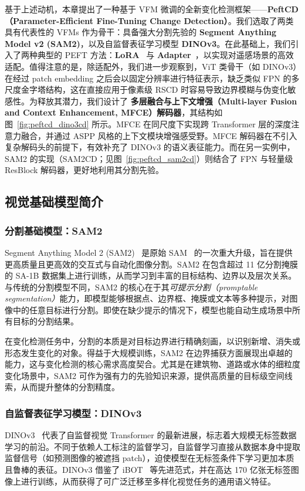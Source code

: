 基于上述动机，本章提出了一种基于 VFM 微调的全新变化检测框架——\textbf{PeftCD（Parameter-Efficient Fine-Tuning Change Detection）}。我们选取了两类具有代表性的 VFMs 作为骨干：具备强大分割先验的 \textbf{Segment Anything Model v2 (SAM2)}，以及自监督表征学习模型 \textbf{DINOv3}。在此基础上，我们引入了两种典型的 PEFT 方法：\textbf{LoRA}~\cite{LORA} 与 \textbf{Adapter}~\cite{adapter}，以实现对遥感场景的高效适配。值得注意的是，除适配外，我们进一步观察到，ViT 类骨干（如 DINOv3）在经过 patch embedding 之后会以固定分辨率进行特征表示，缺乏类似 FPN 的多尺度金字塔结构，这在直接应用于像素级 RSCD 时容易导致边界模糊与伪变化敏感性。为释放其潜力，我们设计了 \textbf{多层融合与上下文增强（Multi-layer Fusion and Context Enhancement, MFCE）解码器}，其结构如图~\ref{fig:peftcd_dino3cd} 所示。MFCE 在同尺度下实现跨 Transformer 层的深度注意力融合，并通过 ASPP 风格的上下文模块增强感受野。MFCE 解码器在不引入复杂解码头的前提下，有效补充了 DINOv3 的语义表征能力。而在另一实例中，SAM2 的实现（SAM2CD；见图~\ref{fig:peftcd_sam2cd}）则结合了 FPN 与轻量级 ResBlock 解码器，更好地利用其分割先验。

\subsection{视觉基础模型简介}

\subsubsection{分割基础模型：SAM2}
Segment Anything Model 2 (SAM2)~\cite{ravi2024sam} 是原始 SAM~\cite{Kirillov2023SegmentA} 的一次重大升级，旨在提供更高质量且更高效的交互式与自动化图像分割。SAM2 在包含超过 11 亿分割掩膜的 SA-1B 数据集上进行训练，从而学习到丰富的目标结构、边界以及层次关系。与传统的分割模型不同，SAM2 的核心在于其\emph{可提示分割（promptable segmentation）}能力，即模型能够根据点、边界框、掩膜或文本等多种提示，对图像中的任意目标进行分割。即使在缺少提示的情况下，模型也能自动生成场景中所有目标的分割结果。

在变化检测任务中，分割的本质是对目标边界进行精确刻画，以识别新增、消失或形态发生变化的对象。得益于大规模训练，SAM2 在边界捕获方面展现出卓越的能力，这与变化检测的核心需求高度契合。尤其是在建筑物、道路或水体的细粒度变化场景中，SAM2 可作为强有力的先验知识来源，提供高质量的目标级空间线索，从而提升整体的分割精度。

\subsubsection{自监督表征学习模型：DINOv3}
DINOv3~\cite{simeoni2025dinov3} 代表了自监督视觉 Transformer 的最新进展，标志着大规模无标签数据学习的前沿。不同于依赖人工标注的监督学习，自监督学习直接从数据本身中提取监督信号（如预测图像的被遮挡 patch），迫使模型在无标签条件下学习更加本质且鲁棒的表征。DINOv3 借鉴了 iBOT~\cite{Zhou2021iBOTIB} 等先进范式，并在高达 170 亿张无标签图像上进行训练，从而获得了可广泛迁移至多样化视觉任务的通用语义特征。


